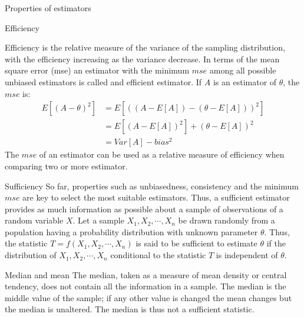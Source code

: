 \documentclass[8pt]{beamer}
\renewcommand{\emph}[1]{\textcolor{myorange}{#1}}
\begin{document}
\begin{frame}{Properties of estimators}
\begin{block}{Efficiency}

    \vspace{-2pt}
    \alert{Efficiency} is the relative measure of the variance of the sampling distribution, with the efficiency increasing as the variance decrease. In terms of the \emph{mean square error (mse)} an estimator with the minimum $mse$ among all possible unbiased estimators is called and \alert{efficient estimator}. If $A$ is an estimator of $\theta$, the $mse$ is:
    \vspace{-9pt}
    \begin{align*}
        E\left[(A-\theta)^2\right] &= E\left[ \left( \left(A - E[A] \right) - \left( \theta - E[A] \right) \right)^2 \right]  \\
                                                                                                                                  &= E[ (A - E[A])^2 ] + (\theta - E[A])^2 \\
                                                                                                                                  &= Var[A] - bias^2
    \end{align*}
    The $mse$ of an estimator can be used as a relative measure of efficiency when comparing two or more estimator. 
    \end{block}

    \vspace{-7pt}
\begin{block}{Sufficiency}
    \vspace{-2pt}
    So far, properties such as unbiasedness, consistency and the minimum $mse$ are key to select the most suitable estimators. Thus, a \alert{sufficient estimator} provides as much information as possible about a sample of observations of a random variable $X$. Let a sample $X_1, X_2, \cdots, X_n$ be drawn randomly from a population having a \emph{probability distribution} with unknown parameter $\theta$. Thus, the statistic $T = f(X_1, X_2, \cdots, X_n)$ is said to be sufficient to estimate $\theta$ if the distribution of $X_1, X_2, \cdots, X_n$ conditional to the statistic $T$ is independent of $\theta$.    
    \end{block}
    \vspace{-9pt}
    \begin{exampleblock}{Median and mean}
        The \emph{median}, taken as a measure of mean density or central tendency, does not contain all the information in a sample. The median is the middle value of the sample; if any other value is changed the mean changes but the median is unaltered. The \emph{median} is thus not a \emph{sufficient} statistic. 
    \end{exampleblock}

\end{frame}
\end{document}
